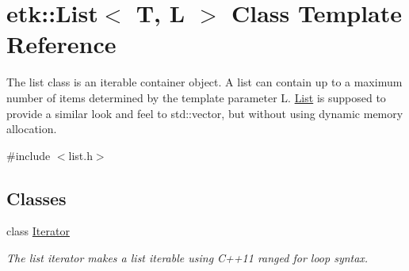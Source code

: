 \hypertarget{classetk_1_1_list}{\section{etk\-:\-:List$<$ T, L $>$ Class Template Reference}
\label{classetk_1_1_list}
}


The list class is an iterable container object. A list can contain up to a maximum number of items determined by the template parameter L. \hyperlink{classetk_1_1_list}{List} is supposed to provide a similar look and feel to std\-::vector, but without using dynamic memory allocation.  




{\ttfamily \#include $<$list.\-h$>$}

\subsection*{Classes}
\begin{DoxyCompactItemize}
\item 
class \hyperlink{classetk_1_1_list_1_1_iterator}{Iterator}
\begin{DoxyCompactList}\small\item\em The list iterator makes a list iterable using C++11 ranged for loop syntax. \end{DoxyCompactList}\end{DoxyCompactItemize}
